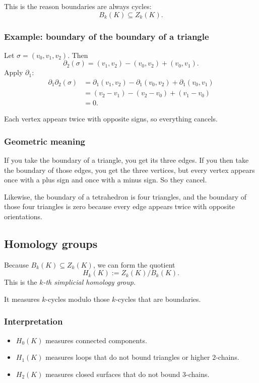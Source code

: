 \documentclass[12pt,a4paper]{article}
\theoremstyle{notespace}
\begin{document}
This is the reason boundaries are always cycles:
\[
B_k(K)\subseteq Z_k(K).
\]

\subsubsection*{Example: boundary of the boundary of a triangle}

Let \(\sigma=(v_0,v_1,v_2)\). Then
\[
\partial_2(\sigma)
=
(v_1,v_2)-(v_0,v_2)+(v_0,v_1).
\]
Apply \(\partial_1\):
\begin{align*}
	\partial_1\partial_2(\sigma)
	&=
	\partial_1(v_1,v_2)-\partial_1(v_0,v_2)+\partial_1(v_0,v_1)\\
	&=
	(v_2-v_1)-(v_2-v_0)+(v_1-v_0)\\
	&=0.
\end{align*}

Each vertex appears twice with opposite signs, so everything cancels.

\subsubsection*{Geometric meaning}

If you take the boundary of a triangle, you get its three edges.  
If you then take the boundary of those edges, you get the three vertices, but every vertex appears once with a plus sign and once with a minus sign. So they cancel.

Likewise, the boundary of a tetrahedron is four triangles, and the boundary of those four triangles is zero because every edge appears twice with opposite orientations.

\subsection{Homology groups}

Because \(B_k(K)\subseteq Z_k(K)\), we can form the quotient
\[
H_k(K):=Z_k(K)/B_k(K).
\]
This is the \emph{\(k\)-th simplicial homology group}.

It measures \(k\)-cycles modulo those \(k\)-cycles that are boundaries.

\subsubsection*{Interpretation}

\begin{itemize}
	\item \(H_0(K)\) measures connected components.
	\item \(H_1(K)\) measures loops that do not bound triangles or higher \(2\)-chains.
	\item \(H_2(K)\) measures closed surfaces that do not bound \(3\)-chains.
\end{itemize}
\end{document}
